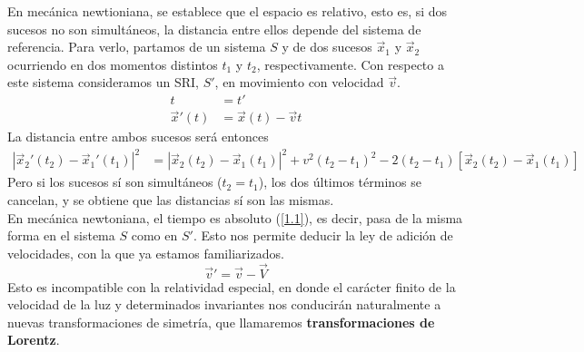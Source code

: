 En mecánica newtioniana, se establece que el espacio es relativo, esto es, si dos sucesos no son simultáneos, la distancia entre ellos depende del sistema de referencia. Para verlo, partamos de un sistema $S$ y de dos sucesos $\vec{x}_1$ y $\vec{x}_2$ ocurriendo en dos momentos distintos $t_1$ y $t_2$, respectivamente. Con respecto a este sistema consideramos un SRI, $S'$, en movimiento con velocidad $\vec{v}$.
\begin{align*} 
    t &= t' \tag{1.1} \label{1.1}\\
    \vec{x}'(t) &= \vec{x}(t)-\vec{v}t  
\end{align*}
La distancia entre ambos sucesos será entonces 
\begin{equation*}
    \begin{split}
        |\vec{x}_2'(t_2) - \vec{x}_1'(t_1)|^2 &= |\vec{x}_2(t_2) - \vec{x}_1(t_1)|^2 + v^2(t_2-t_1)^2 - 2(t_2-t_1)[\vec{x}_2(t_2) - \vec{x}_1(t_1)]
    \end{split}
\end{equation*}
Pero si los sucesos sí son simultáneos ($t_2=t_1$), los dos últimos términos se cancelan, y se obtiene que las distancias sí son las mismas. \\

En mecánica newtoniana, el tiempo es absoluto (\ref{1.1}), es decir, pasa de la misma forma en el sistema $S$ como en $S'$. Esto nos permite deducir la ley de adición de velocidades, con la que ya estamos familiarizados. 
$$
\vec{v}' = \vec{v} - \vec{V}
$$
Esto es incompatible con la relatividad especial, en donde el carácter finito de la velocidad de la luz y determinados invariantes nos conducirán naturalmente a nuevas transformaciones de simetría, que llamaremos \textbf{transformaciones de Lorentz}.

